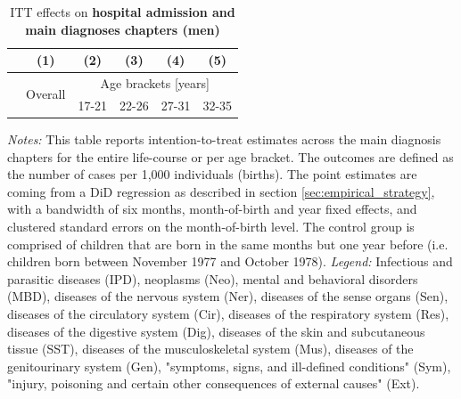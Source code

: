 \documentclass[11pt, a4paper]{article} %
\begin{document}
\newpage
{} 
\vspace*{\fill}
\begin{table}[H] \centering 
	\begin{threeparttable} \centering \caption{ITT effects on \textbf{hospital admission and main diagnoses chapters (men)}}\label{tab: ITT_across_chapters_per_age_group_men}
		{\def\sym#1{\ifmmode^{#1}\else\(^{#1}\)\fi} 
			\begin{tabular}{l*{5}{c}}
				\toprule 
				&\multicolumn{1}{c}{(1)}&\multicolumn{1}{c}{(2)}&\multicolumn{1}{c}{(3)}&\multicolumn{1}{c}{(4)}&\multicolumn{1}{c}{(5)}\\
				\midrule
				&\multirow{2}{*}{Overall} & \multicolumn{4}{c}{Age brackets [years]} \\ 
				\cmidrule(lr){3-6}
				&&\multicolumn{1}{c}{17-21}&\multicolumn{1}{c}{22-26}&\multicolumn{1}{c}{27-31}&\multicolumn{1}{c}{32-35}\\
				
				\midrule
				
				
				
				\bottomrule 
		\end{tabular}}
	\end{threeparttable} 
	\begin{minipage}{0.9\linewidth}
		\scriptsize \emph{Notes:} This table reports intention-to-treat estimates across the main diagnosis chapters for the entire life-course or per age bracket. The outcomes are defined as the number of cases per 1,000 individuals (births). The point estimates are coming from a DiD regression as described in section \ref{sec:empirical_strategy}, with a bandwidth of six months, month-of-birth and year fixed effects, and clustered standard errors on the month-of-birth level. The control group is comprised of children that are born in the same months but one year before (i.e. children born between November 1977 and October 1978).\newline
		\emph{Legend:} Infectious and parasitic diseases (IPD), neoplasms (Neo), mental and behavioral disorders (MBD), diseases of the nervous system (Ner), diseases of the sense organs (Sen), diseases of the circulatory system (Cir), diseases of the respiratory system (Res), diseases of the digestive system (Dig), diseases of the skin and subcutaneous tissue (SST), diseases of the musculoskeletal system (Mus), diseases of the genitourinary system (Gen), "symptoms, signs, and ill-defined conditions" (Sym), "injury, poisoning and certain other consequences of external causes" (Ext).
	\end{minipage}
\end{table} 
\vspace*{\fill}\clearpage 
\restoregeometry
\end{document}
